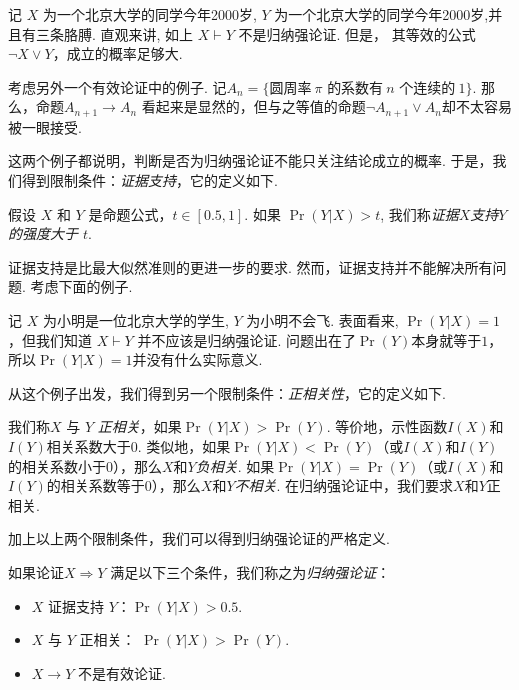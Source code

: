 \begin{example}[奇怪的例子一]
记 $X$ 为一个北京大学的同学今年2000岁, $Y$ 为一个北京大学的同学今年2000岁,并且有三条胳膊. 直观来讲, 如上 $X\vdash Y$ 不是归纳强论证. 但是， 其等效的公式$\neg X\vee Y$，成立的概率足够大. 

考虑另外一个有效论证中的例子. 记$A_n=\{\text{圆周率}~\pi\text{ 的系数有}~n\text{ 个连续的}~1\}$. 那么，命题$A_{n+1} \rightarrow A_n$ 看起来是显然的，但与之等值的命题$\neg A_{n+1} \vee A_n$却不太容易被一眼接受.
\end{example}
这两个例子都说明，判断是否为归纳强论证不能只关注结论成立的概率. 于是，我们得到限制条件：\emph{证据支持}，它的定义如下. 
\begin{definition}[证据支持]
    假设 $X$ 和 $Y$ 是命题公式，$t\in [0.5, 1]$. 如果 $\Pr(Y|X)>t$, 我们称\emph{证据$X$支持$Y$的强度大于 $t$}. 
\end{definition}

证据支持是比最大似然准则的更进一步的要求. 然而，证据支持并不能解决所有问题. 考虑下面的例子.

\begin{example}[奇怪的例子二]
记 $X$ 为小明是一位北京大学的学生, $Y$ 为小明不会飞. 表面看来, $\Pr(Y|X)=1$，但我们知道 $X\vdash Y$ 并不应该是归纳强论证. 问题出在了$\Pr(Y)$本身就等于$1$，所以$\Pr(Y|X)=1$并没有什么实际意义.
\end{example}

从这个例子出发，我们得到另一个限制条件：\emph{正相关性}，它的定义如下. 

\begin{definition}[相关性]
    我们称$X$ 与 $Y$ \emph{正相关}，如果$\Pr(Y|X) > \Pr(Y)$. 等价地，示性函数$I(X)$和$I(Y)$相关系数大于$0$. 类似地，如果$\Pr(Y|X) < \Pr(Y)$（或$I(X)$和$I(Y)$的相关系数小于$0$），那么$X$和$Y$\emph{负相关}. 如果$\Pr(Y|X) = \Pr(Y)$（或$I(X)$和$I(Y)$的相关系数等于$0$），那么$X$和$Y$\emph{不相关}. 在归纳强论证中，我们要求$X$和$Y$正相关.
\end{definition}

加上以上两个限制条件，我们可以得到归纳强论证的严格定义.

\begin{definition}[归纳强论证]
    如果论证$X \Rightarrow Y$ 满足以下三个条件，我们称之为\emph{归纳强论证}：
	\begin{itemize}
	\item $X$ 证据支持 $Y$：$\Pr(Y|X)>0.5$.
	\item $X$ 与 $Y$ 正相关： $\Pr(Y|X) > \Pr(Y)$. 
	\item $X\rightarrow Y$ 不是有效论证.
	\end{itemize}
\end{definition}


